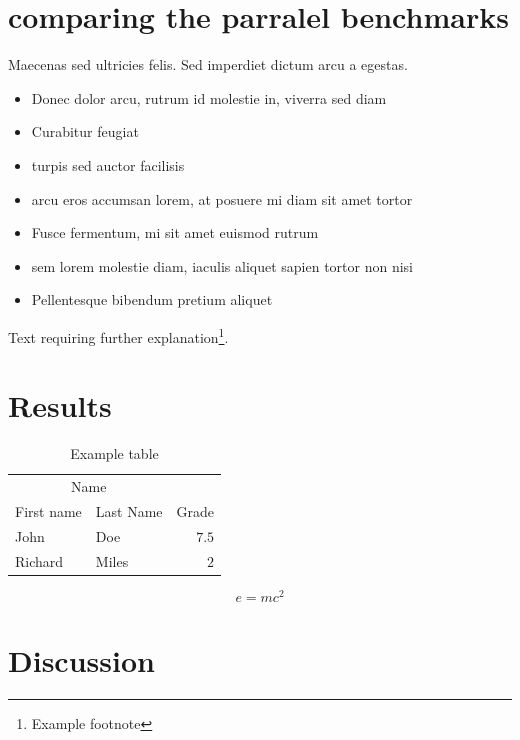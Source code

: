 \documentclass[twoside,twocolumn]{article}
\begin{document}
\section{comparing the parralel benchmarks}

Maecenas sed ultricies felis. Sed imperdiet dictum arcu a egestas. 
\begin{itemize}
\item Donec dolor arcu, rutrum id molestie in, viverra sed diam
\item Curabitur feugiat
\item turpis sed auctor facilisis
\item arcu eros accumsan lorem, at posuere mi diam sit amet tortor
\item Fusce fermentum, mi sit amet euismod rutrum
\item sem lorem molestie diam, iaculis aliquet sapien tortor non nisi
\item Pellentesque bibendum pretium aliquet
\end{itemize}
\blindtext %

Text requiring further explanation\footnote{Example footnote}.


\section{Results}

\begin{table}
\caption{Example table}
\centering
\begin{tabular}{llr}
\toprule
\multicolumn{2}{c}{Name} \\
\cmidrule(r){1-2}
First name & Last Name & Grade \\
\midrule
John & Doe & $7.5$ \\
Richard & Miles & $2$ \\
\bottomrule
\end{tabular}
\end{table}

\blindtext %

\begin{equation}
\label{eq:emc}
e = mc^2
\end{equation}

\blindtext %


\section{Discussion}
\end{document}
